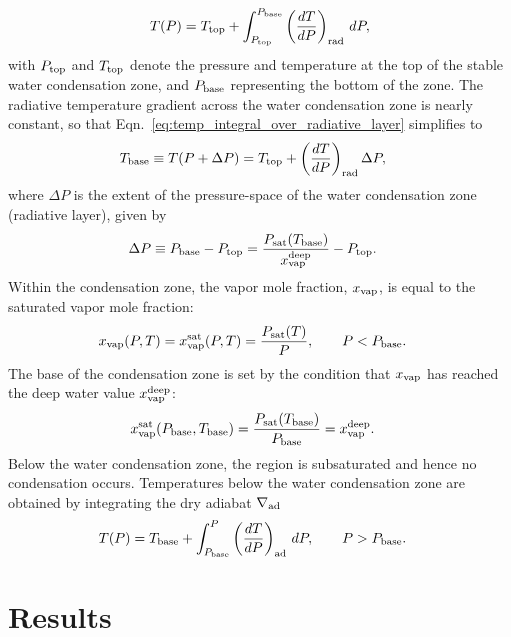 \documentclass[11pt]{ucscthesisbs}
\begin{document}
\begin{equation}
  T(P) = T_{\rm top} + \int_{P_{\rm top}}^{P_{\rm base}} \left(\frac{dT}{dP}\right)_{\rm rad}\,d P ,
  \label{eq:temp_integral_over_radiative_layer}
\end{equation}
with $P_{\rm top}$ and $T_{\rm top}$ denote the pressure and temperature at the top of the stable water condensation zone, and $P_{\rm base}$ representing the bottom of the zone. The radiative temperature gradient across the water condensation zone is nearly constant, so that Eqn.~\ref{eq:temp_integral_over_radiative_layer} simplifies to
\begin{align}
T_{\rm base}\equiv T(P+\Delta P) &= T_{\rm top} + \left(\frac{dT}{dP}\right)_{\rm rad}\Delta P ,
\label{eq:temperature_profile_over_radiative_layer_simplification}
\end{align}
where $\Delta P$ is the extent of the pressure-space of the water condensation zone (radiative layer), given by
\begin{align}
\Delta P \equiv P_{\rm base}-P_{\rm top} &= \frac{P_{\rm sat}(T_{\rm base})}{x_{\rm vap}^{\rm deep}} - P_{\rm top}.
\label{eq:delta_P_over_radiative_layer}
\end{align}
Within the condensation zone, the vapor mole fraction, $x_{\rm vap}$, is equal to the saturated vapor mole fraction:
\begin{align}
x_{\rm vap}(P, T) &= x_{\rm vap}^{\rm sat}(P, T) = \frac{P_{\rm sat}(T)}{P}, \qquad P<P_{\rm base}.
\label{eq:vapor_mole_fraction_within_condensation_zone}
\end{align}
The base of the condensation zone is set by the condition that $x_{\rm vap}$ has reached the deep water value $x_{\rm vap}^{\rm deep}$:
\begin{align}
x_{\rm vap}^{\rm sat}(P_{\rm base}, T_{\rm base}) &= \frac{P_{\rm sat}(T_{\rm base})}{P_{\rm base}}=x_{\rm vap}^{\rm deep}.
\end{align}
Below the water condensation zone, the region is subsaturated and hence no condensation occurs. Temperatures below the water condensation zone are obtained by integrating the dry adiabat $\nabla_{\rm ad}$
\begin{align}
T(P) &= T_{\rm base} + \int_{P_{\rm base}}^P\left(\frac{dT}{dP}\right)_{\rm ad}\,d P, \qquad  P>P_{\rm base} .
\label{eq:dry_adiabat_integration}
\end{align}


\chapter{Results}
\end{document}
